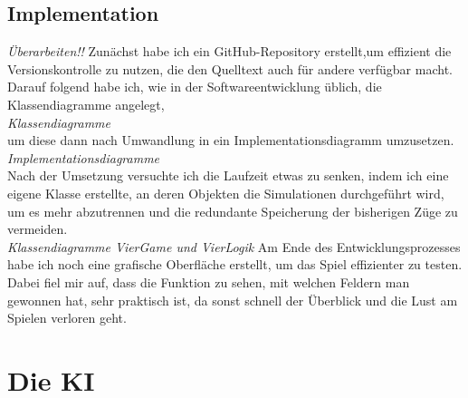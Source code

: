 \documentclass[12pt,a4paper,ngerman]{article}
\begin{document}
	\subsection{Implementation}
	\textit{Überarbeiten!!}
	Zunächst habe ich ein GitHub-Repository erstellt,um effizient die Versionskontrolle zu nutzen, die den Quelltext auch für andere verfügbar macht.
	Darauf folgend habe ich, wie in der Softwareentwicklung üblich, die Klassendiagramme angelegt,\\
	\textit{Klassendiagramme}\\
	 um diese dann nach Umwandlung in ein Implementationsdiagramm umzusetzen.\\
	\textit{Implementationsdiagramme}\\
	Nach der Umsetzung versuchte ich die Laufzeit etwas zu senken, indem ich eine eigene Klasse erstellte, an deren Objekten die Simulationen durchgeführt wird, um es mehr abzutrennen und die redundante Speicherung der bisherigen Züge zu vermeiden.\\
	\textit{Klassendiagramme VierGame und VierLogik}
	Am Ende des Entwicklungsprozesses habe ich noch eine grafische Oberfläche erstellt, um das Spiel effizienter zu testen. Dabei fiel mir auf, dass die Funktion zu sehen, mit welchen Feldern man gewonnen hat, sehr praktisch ist, da sonst schnell der Überblick und die Lust am Spielen verloren geht.
	\section{Die KI}
\end{document}
